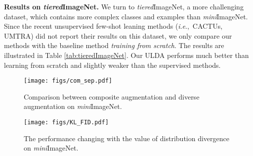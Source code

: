\documentclass[letterpaper]{article} \usepackage{aaai21}  \usepackage{times}  \usepackage{helvet} \usepackage{courier}  \usepackage[hyphens]{url}  \usepackage{graphicx} \urlstyle{rm} \def\UrlFont{\rm}  \usepackage{natbib}  \usepackage{caption} \usepackage{url}
\newcommand{\ie}{\textit{i}.\textit{e}.,}
\begin{document}
\textbf{Results on \emph{tiered}ImageNet.}
We turn to \emph{tiered}ImageNet, a more challenging dataset, which contains more complex classes and examples than \emph{mini}ImageNet. Since the recent unsupervised few-shot leaning methods (\ie~CACTUs, UMTRA) did not report their results on this dataset, we only compare our methods with the baseline method \textit{training from scratch}. The results are illustrated in Table \ref{tab:tieredImageNet}. Our ULDA performs much better than learning from scratch and slightly weaker than the supervised methods.




\begin{figure}[!tbp]
\centering
\texttt{[image: figs/com\_sep.pdf]}
\vspace{-0.3cm}
\caption{Comparison between composite augmentation and diverse augmentation on \emph{mini}ImageNet.}
\label{fig:com_sep}
\end{figure}

\begin{figure}[!tbp]
\centering
\texttt{[image: figs/KL\_FID.pdf]}
\vspace{-0.3cm}
\caption{The performance changing with the value of distribution divergence on \emph{mini}ImageNet.}
\label{fig:distribution_difference}
\vspace{-0.2cm}
\end{figure}
\end{document}
